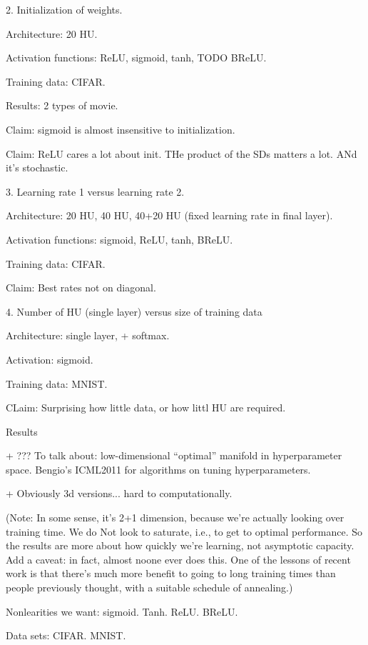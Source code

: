 \documentclass[10pt]{article}
\begin{document}
2. Initialization of weights.

Architecture: 20 HU.

Activation functions: ReLU, sigmoid, tanh, TODO BReLU.

Training data: CIFAR.

Results: 2 types of movie. 

Claim: sigmoid is almost insensitive to initialization.

Claim: ReLU cares a lot about init.  THe product of the SDs matters a
lot.  ANd it's stochastic.




3. Learning rate 1 versus learning rate 2.

Architecture: 20 HU, 40 HU, 40+20 HU (fixed learning rate in final
layer).

Activation functions: sigmoid, ReLU, tanh, BReLU.

Training data: CIFAR.

Claim: Best rates not on diagonal.


4. Number of HU (single layer) versus size of training data

Architecture: single layer, + softmax.

Activation: sigmoid.

Training data: MNIST.


CLaim: Surprising how little data, or how littl HU are required.




Results

+ ??? To talk about: low-dimensional ``optimal'' manifold in
hyperparameter space.  Bengio's ICML2011 for algorithms on tuning
hyperparameters.

+ Obviously 3d versions... hard to computationally.

(Note: In some sense, it's 2+1 dimension, because we're actually
looking over training time.  We do Not look to saturate, i.e., to
get to optimal performance.  So the results are more about how quickly
we're learning, not asymptotic capacity.  Add a caveat: in fact,
almost noone ever does this.  One of the lessons of recent work is
that there's much more benefit to going to long training times than
people previously thought, with a suitable schedule of annealing.)







Nonlearities we want: sigmoid.  Tanh.  ReLU.  BReLU.

Data sets: CIFAR.  MNIST.
\end{document}
